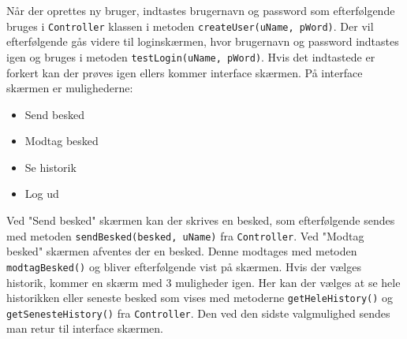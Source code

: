 \newline
Når der oprettes ny bruger, indtastes brugernavn og password som efterfølgende bruges i \texttt{Controller} klassen i metoden \texttt{createUser(uName, pWord)}. Der vil efterfølgende gås videre til loginskærmen, hvor brugernavn og password indtastes igen og bruges i metoden \texttt{testLogin(uName, pWord)}. Hvis det indtastede er forkert kan der prøves igen ellers kommer interface skærmen.
\newline
På interface skærmen er mulighederne:
\begin{itemize}
	\item Send besked
	\item Modtag besked
	\item Se historik 
	\item Log ud
\end{itemize}
Ved "Send besked" skærmen kan der skrives en besked, som efterfølgende sendes med metoden \texttt{sendBesked(besked, uName)} fra \texttt{Controller}. Ved "Modtag besked" skærmen afventes der en besked. Denne modtages med metoden \texttt{modtagBesked()} og bliver efterfølgende vist på skærmen. Hvis der vælges historik, kommer en skærm med 3 muligheder igen. Her kan der vælges at se hele historikken eller seneste besked som vises med metoderne \texttt{getHeleHistory()} og \texttt{getSenesteHistory()} fra \texttt{Controller}. Den ved den sidste valgmulighed sendes man retur til interface skærmen.